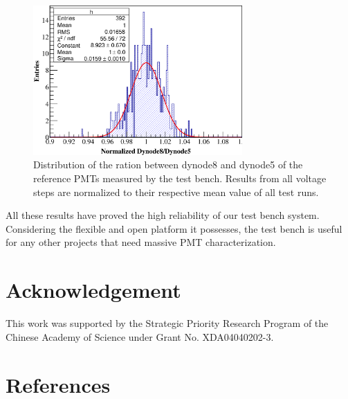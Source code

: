 \documentclass[review, times]{elsarticle}
\begin{document}
\begin{figure}
 \centering
 \includegraphics[width=80mm]{RefDy58Dist}
\caption{Distribution of the ration between dynode8 and dynode5 of the reference PMTs measured by the test bench.
Results from all voltage steps are normalized to their respective mean value of all test runs.}
\label{fig:dy58_stabiltiy}
\end{figure} 

All these results have proved the high reliability of our test bench system.
Considering the flexible and open platform it possesses, the test bench is useful for any other projects that need massive PMT characterization. 

\section*{Acknowledgement}

This work was supported by the Strategic Priority Research Program of the Chinese Academy of Science under Grant No. XDA04040202-3.


\section*{References}

\end{document}
